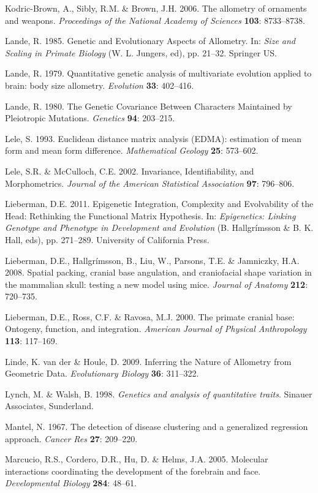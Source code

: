 \documentclass[12pt,twoside]{report}
\begin{document}
Kodric-Brown, A., Sibly, R.M. \& Brown, J.H. 2006. The allometry of
ornaments and weapons. \emph{Proceedings of the National Academy of
Sciences} \textbf{103}: 8733--8738.

Lande, R. 1985. Genetic and Evolutionary Aspects of Allometry. In:
\emph{Size and Scaling in Primate Biology} (W. L. Jungers, ed), pp.
21--32. Springer US.

Lande, R. 1979. Quantitative genetic analysis of multivariate evolution
applied to brain: body size allometry. \emph{Evolution} \textbf{33}:
402--416.

Lande, R. 1980. The Genetic Covariance Between Characters Maintained by
Pleiotropic Mutations. \emph{Genetics} \textbf{94}: 203--215.

Lele, S. 1993. Euclidean distance matrix analysis (EDMA): estimation of
mean form and mean form difference. \emph{Mathematical Geology}
\textbf{25}: 573--602.

Lele, S.R. \& McCulloch, C.E. 2002. Invariance, Identifiability, and
Morphometrics. \emph{Journal of the American Statistical Association}
\textbf{97}: 796--806.

Lieberman, D.E. 2011. Epigenetic Integration, Complexity and
Evolvability of the Head: Rethinking the Functional Matrix Hypothesis.
In: \emph{Epigenetics: Linking Genotype and Phenotype in Development and
Evolution} (B. Hallgrímsson \& B. K. Hall, eds), pp. 271--289.
University of California Press.

Lieberman, D.E., Hallgrímsson, B., Liu, W., Parsons, T.E. \& Jamniczky,
H.A. 2008. Spatial packing, cranial base angulation, and craniofacial
shape variation in the mammalian skull: testing a new model using mice.
\emph{Journal of Anatomy} \textbf{212}: 720--735.

Lieberman, D.E., Ross, C.F. \& Ravosa, M.J. 2000. The primate cranial
base: Ontogeny, function, and integration. \emph{American Journal of
Physical Anthropology} \textbf{113}: 117--169.

Linde, K. van der \& Houle, D. 2009. Inferring the Nature of Allometry
from Geometric Data. \emph{Evolutionary Biology} \textbf{36}: 311--322.

Lynch, M. \& Walsh, B. 1998. \emph{Genetics and analysis of quantitative
traits}. Sinauer Associates, Sunderland.

Mantel, N. 1967. The detection of disease clustering and a generalized
regression approach. \emph{Cancer Res} \textbf{27}: 209--220.

Marcucio, R.S., Cordero, D.R., Hu, D. \& Helms, J.A. 2005. Molecular
interactions coordinating the development of the forebrain and face.
\emph{Developmental Biology} \textbf{284}: 48--61.
\end{document}
